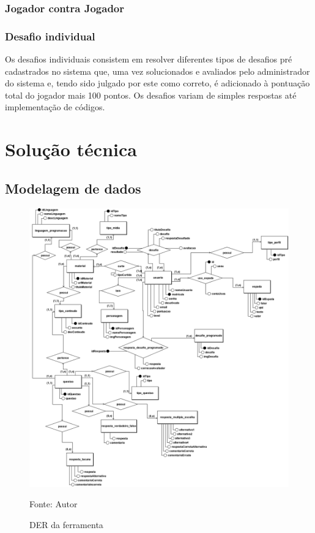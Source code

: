 \subsection{Jogador contra Jogador}

\subsection{Desafio individual}
Os desafios individuais consistem em resolver diferentes tipos de  desafios pré cadastrados no sistema que, uma vez 
solucionados e avaliados pelo administrador do sistema e, tendo sido julgado por este como correto, é adicionado à
pontuação total do jogador mais 100 pontos. Os  desafios variam de simples respostas até implementação de códigos.



\chapter{Solução técnica}


\section{Modelagem de dados}

\begin{figure}[h]
	\centering
	\includegraphics[keepaspectratio=true,scale=0.4]{figuras/der.png}
	\caption{DER da ferramenta}
	Fonte: Autor
	\label{figura2}
\end{figure}


